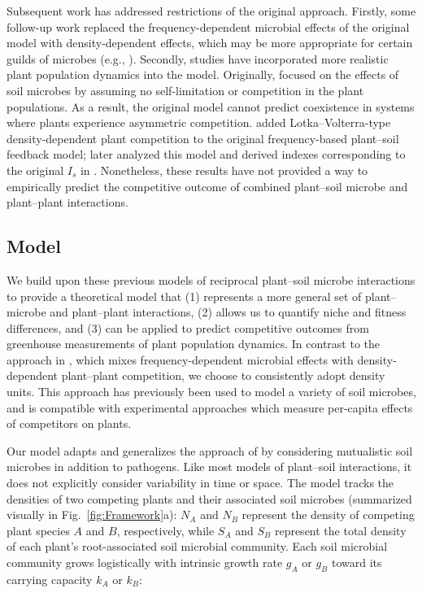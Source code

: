 Subsequent work has addressed restrictions of the original approach.
Firstly, some follow-up work replaced the frequency-dependent microbial effects of the original model with density-dependent effects, which may be more appropriate for certain guilds of microbes (e.g., \citealt{Umbanhowar2005, Eppinga2006}).
Secondly, studies have incorporated more realistic plant population dynamics into the model. Originally, \citet{Bever1997} focused on the effects of soil microbes by assuming no self-limitation or competition in the plant populations. As a result, the original model cannot predict coexistence in systems where plants experience asymmetric competition. \citet{Bever2003} added Lotka--Volterra-type density-dependent plant competition to the original frequency-based plant--soil feedback model; \citet{Revilla2013} later analyzed this model and derived indexes corresponding to the original $I_{s}$ in \citet{Bever1997}. Nonetheless, these results have not provided a way to empirically predict the competitive outcome of combined plant--soil microbe and plant--plant interactions.
\par



\subsection{Model}
We build upon these previous models of reciprocal plant--soil microbe interactions to provide a theoretical model that (1) represents a more general set of plant--microbe and plant--plant interactions, (2) allows us to quantify niche and fitness differences, and (3) can be applied to predict competitive outcomes from greenhouse measurements of plant population dynamics.
In contrast to the approach in \citet{Bever2003}, which mixes frequency-dependent microbial effects with density-dependent plant--plant competition, we choose to consistently adopt density units. This approach has previously been used to model a variety of
soil microbes, and is compatible with experimental approaches which measure per-capita effects of competitors on plants.
\par


Our model adapts and generalizes the approach of \citet{Eppinga2006} by considering mutualistic soil microbes in addition to pathogens. Like most models of plant--soil interactions, it does not explicitly consider variability in time or space. The model tracks the densities of two competing plants and their associated soil microbes (summarized visually in Fig.~\ref{fig:Framework}a): $N_{A}$ and $N_{B}$ represent the density of competing plant species $A$ and $B$, respectively, while $S_{A}$ and $S_{B}$ represent the total density of each plant's root-associated soil microbial community. Each soil microbial community grows logistically with intrinsic growth rate $g_{A}$ or $g_{B}$ toward its carrying capacity $k_{A}$ or $k_{B}$:

